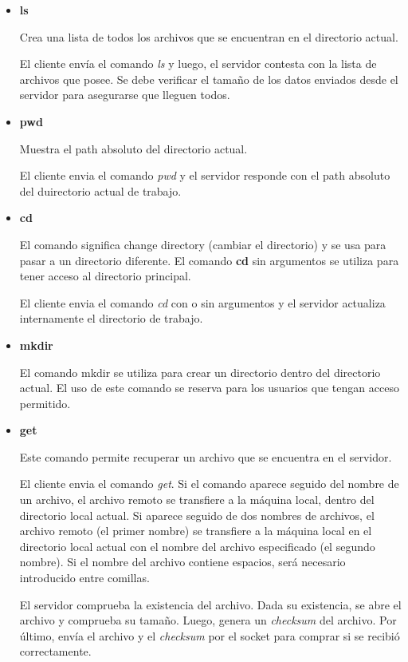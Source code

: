 \documentclass[osajnl,twocolumn,showpacs,superscriptaddress,10pt]{revtex4-1} %
\begin{document}
\begin{itemize}
    \item \textbf{ls}
    
    Crea una lista de todos los archivos que se encuentran en el directorio actual.
    
    El cliente envía el comando \textit{ls} y luego, el servidor contesta con la lista de archivos que posee. Se debe verificar el tamaño de los datos enviados desde el servidor para asegurarse que lleguen todos.

    
    \item \textbf{pwd}
    
    Muestra el path absoluto del directorio actual.
    
    El cliente envia el comando \textit{pwd} y el servidor responde con el path absoluto del duirectorio actual de trabajo.
    
    \item \textbf{cd}
    
    El comando significa change directory (cambiar el directorio) y se usa para pasar a un directorio diferente. El comando \textbf{cd} sin argumentos se utiliza para tener acceso al directorio principal.
    
    El cliente envia el comando \textit{cd} con o sin argumentos y el servidor actualiza internamente el directorio de trabajo.
    
    \item \textbf{mkdir}
    
    El comando mkdir se utiliza para crear un directorio dentro del directorio actual. El uso de este comando se reserva para los usuarios que tengan acceso permitido.

    \item \textbf{get}
    
    Este comando permite recuperar un archivo que se encuentra en el servidor.
    
    El cliente envia el comando \textit{get}. Si el comando aparece seguido del nombre de un archivo, el archivo remoto se transfiere a la máquina local, dentro del directorio local actual. Si aparece seguido de dos nombres de archivos, el archivo remoto (el primer nombre) se transfiere a la máquina local en el directorio local actual con el nombre del archivo especificado (el segundo nombre). Si el nombre del archivo contiene espacios, será necesario introducido entre comillas.
    
    El servidor comprueba la existencia del archivo. Dada su existencia, se abre el archivo y comprueba su tamaño. Luego, genera un \textit{checksum} del archivo. Por último, envía el archivo y el \textit{checksum} por el socket para comprar si se recibió correctamente.
    

\end{itemize}
\end{document}
